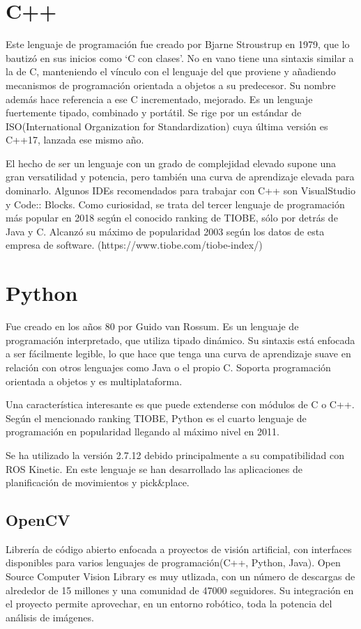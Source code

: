 \documentclass[12pt,spanish,chapterprefix, numbers=noenddot]{book}
\numberwithin{equation}{section}
\numberwithin{figure}{section}
\begin{document}
\section{C++}
Este lenguaje de programación fue creado por Bjarne Stroustrup en 1979, que lo bautizó en sus inicios como ‘C con clases’. No en vano tiene una sintaxis similar a la de C, manteniendo el vínculo con el lenguaje del que proviene y añadiendo mecanismos de programación orientada a objetos a su predecesor. Su nombre además hace referencia a ese C incrementado, mejorado. 
Es un lenguaje fuertemente tipado, combinado y portátil. Se rige por un estándar de ISO(International Organization for Standardization) cuya última versión es C++17, lanzada ese mismo año. 

El hecho de ser un lenguaje con un grado de complejidad elevado supone una gran versatilidad y potencia, pero también una curva de aprendizaje elevada para dominarlo.
Algunos IDEs recomendados para trabajar con C++ son VisualStudio y Code:: Blocks. 
Como curiosidad, se trata del tercer lenguaje de programación más popular en 2018 según el conocido ranking de TIOBE, sólo por detrás de Java y C. Alcanzó su máximo de popularidad 2003 según los datos de esta empresa de software. (https://www.tiobe.com/tiobe-index/)

\section{Python}
Fue creado en los años 80 por Guido van Rossum. Es un lenguaje de programación interpretado, que utiliza tipado dinámico. Su sintaxis está enfocada a ser fácilmente legible, lo que hace que tenga una curva de aprendizaje suave en relación con otros lenguajes como Java o el propio C. Soporta programación orientada a objetos y es multiplataforma.

Una característica interesante es que puede extenderse con módulos de C o C++.
Según el mencionado ranking TIOBE, Python es el cuarto lenguaje de programación en popularidad llegando al máximo nivel en 2011. 

Se ha utilizado la versión 2.7.12 debido principalmente a su compatibilidad con ROS Kinetic. En este lenguaje se han desarrollado las aplicaciones de planificación de movimientos y pick\&place. 

\subsection{OpenCV}
Librería de código abierto enfocada a proyectos de visión artificial, con interfaces disponibles para varios lenguajes de programación(C++, Python, Java). 
Open Source Computer Vision Library es muy utlizada, con un número de descargas de alrededor de 15 millones y una comunidad de 47000 seguidores.  
Su integración en el proyecto permite aprovechar, en un entorno robótico, toda la potencia del análisis de imágenes. 
\end{document}
